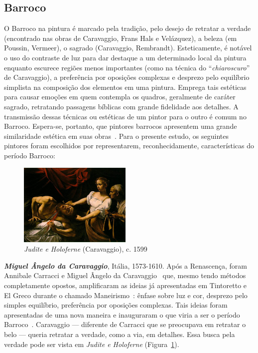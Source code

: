 \subsection{Barroco}

O Barroco na pintura é marcado pela tradição, pelo desejo de retratar
a verdade (encontrado nas obras de Caravaggio, Frans Hals e
Velázquez), a beleza (em Poussin, Vermeer), o sagrado (Caravaggio,
Rembrandt). Esteticamente, é notável o uso do contraste de luz para
dar destaque a um determinado local da pintura enquanto escurece
regiões menos importantes (como na técnica do ``\textit{chiaroscuro}''
de Caravaggio), a preferência por oposições complexas e desprezo pelo
equilíbrio simplista na composição dos elementos em uma
pintura. Emprega tais estéticas para causar emoções em quem contempla
os quadros, geralmente de caráter sagrado, retratando passagens
bíblicas com grande fidelidade aos detalhes. A transmissão dessas
técnicas ou estéticas de um pintor para o outro é comum no
Barroco. Espera-se, portanto, que pintores barrocos apresentem uma
grande similaridade estética em suas
obras~\cite{gombrich,hills,gardner}. Para o presente estudo, os
seguintes pintores foram escolhidos por representarem,
reconhecidamente, características do período Barroco:

\begin{figure}
  \begin{center}
    \includegraphics[width=0.48\textwidth]{figs/caravaggio_judite.png}
  \end{center}
  \caption{\emph{Judite e Holoferne} (Caravaggio), c. 1599}
  \label{fig:caravaggio:judite}
\end{figure}

\textbf{\emph{Miguel Ângelo da Caravaggio}}, Itália, 1573-1610.  Após
a Renascença, foram Annibale Carracci e Miguel Ângelo da
Caravaggio~\cite{bayer} que, mesmo tendo métodos completamente
opostos, amplificaram as ideias já apresentadas em Tintoretto e El
Greco durante o chamado Maneirismo~\cite{tatarkiewicz}: ênfase sobre
luz e cor, desprezo pelo simples equilíbrio, preferência por oposições
complexas. Tais ideias foram apresentadas de uma nova maneira e
inauguraram o que viria a ser o período
Barroco~\cite{hills}. Caravaggio --- diferente de Carracci que se
preocupava em retratar o belo --- queria retratar a verdade, como a
via, em detalhes. Essa busca pela verdade pode ser vista em
\emph{Judite e Holoferne}
(Figura~\ref{fig:caravaggio:judite}).~\cite{puglisi,caravaggio}

